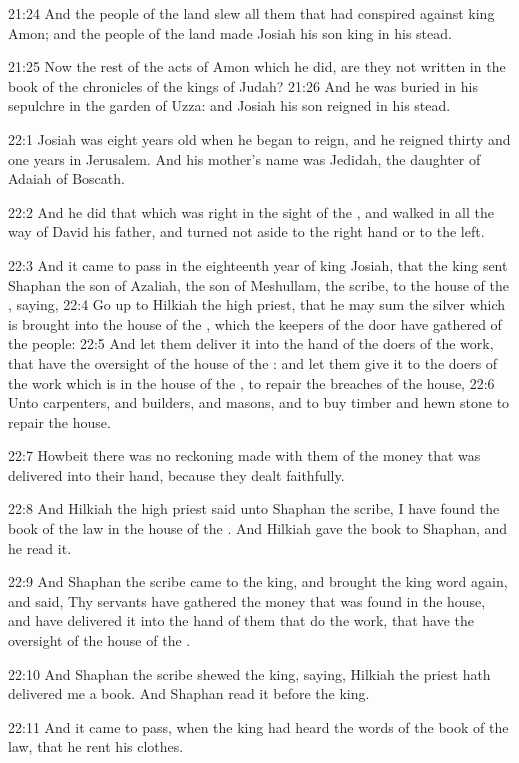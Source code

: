 21:24 And the people of the land slew all them that had conspired against king Amon; and the people of the land made Josiah his son king in his stead.

21:25 Now the rest of the acts of Amon which he did, are they not written in the book of the chronicles of the kings of Judah?  21:26 And he was buried in his sepulchre in the garden of Uzza: and Josiah his son reigned in his stead.

22:1 Josiah was eight years old when he began to reign, and he reigned thirty and one years in Jerusalem. And his mother's name was Jedidah, the daughter of Adaiah of Boscath.

22:2 And he did that which was right in the sight of the \LORD, and walked in all the way of David his father, and turned not aside to the right hand or to the left.

22:3 And it came to pass in the eighteenth year of king Josiah, that the king sent Shaphan the son of Azaliah, the son of Meshullam, the scribe, to the house of the \LORD, saying, 22:4 Go up to Hilkiah the high priest, that he may sum the silver which is brought into the house of the \LORD, which the keepers of the door have gathered of the people: 22:5 And let them deliver it into the hand of the doers of the work, that have the oversight of the house of the \LORD: and let them give it to the doers of the work which is in the house of the \LORD, to repair the breaches of the house, 22:6 Unto carpenters, and builders, and masons, and to buy timber and hewn stone to repair the house.

22:7 Howbeit there was no reckoning made with them of the money that was delivered into their hand, because they dealt faithfully.

22:8 And Hilkiah the high priest said unto Shaphan the scribe, I have found the book of the law in the house of the \LORD. And Hilkiah gave the book to Shaphan, and he read it.

22:9 And Shaphan the scribe came to the king, and brought the king word again, and said, Thy servants have gathered the money that was found in the house, and have delivered it into the hand of them that do the work, that have the oversight of the house of the \LORD.

22:10 And Shaphan the scribe shewed the king, saying, Hilkiah the priest hath delivered me a book. And Shaphan read it before the king.

22:11 And it came to pass, when the king had heard the words of the book of the law, that he rent his clothes.

